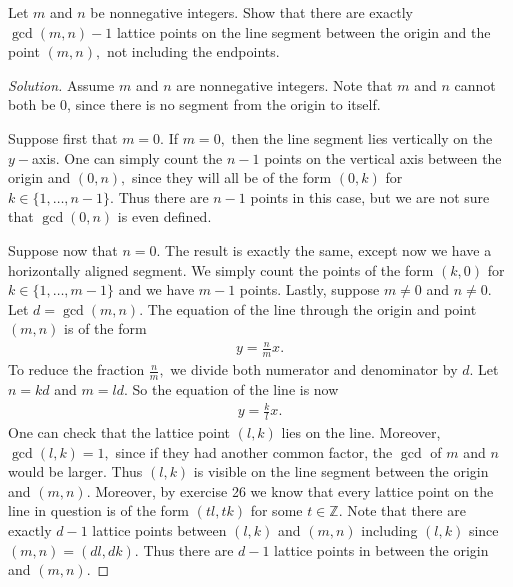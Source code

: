 \documentclass[12pt]{article}
\newcommand{\Z}{\mathbb{Z}}
\newenvironment{exercise}[2][Exercise]{\begin{trivlist}
        \item[\hskip \labelsep {\bfseries #1}\hskip \labelsep {\bfseries #2.}]}{\end{trivlist}}
\newenvironment{solution}
        {\begin{proof}[Solution]}
                    {\end{proof}}
\begin{document}
\begin{exercise}{27}
    Let \( m \) and \( n \) be nonnegative integers. Show that there are exactly \( \gcd(m,n ) -1 \) lattice points on the line segment between the origin and the point \( ( m,n ) , \) not including the endpoints.
    \begin{solution}
        Assume \( m \) and \( n \) are nonnegative integers. Note that \( m \) and \( n \) cannot both be 0, since there is no segment from the origin to itself.
        
        Suppose first that \( m = 0. \) If \( m=0, \) then the line segment lies vertically on the \( y- \)axis. One can simply count the \( n-1 \) points on the vertical axis between the origin and \( ( 0,n ) , \) since they will all be of the form \( ( 0,k ) \) for \( k \in \{ 1, \ldots, n-1 \} . \) Thus there are \( n-1 \) points in this case, but we are not sure that \( \gcd(0,n) \) is even defined.
        
        Suppose now that \( n = 0. \) The result is exactly the same, except now we have a horizontally aligned segment. We simply count the points of the form \( ( k, 0 ) \) for \( k \in \{ 1, \ldots, m-1 \} \) and we have \( m-1 \) points.
        Lastly, suppose \( m \neq 0 \) and \( n\neq 0. \) Let \( d = \gcd(m,n) . \) The equation of the line through the origin and point \( ( m,n ) \) is of the form
        \begin{align*}
            y = \frac{n}{m} x.
        \end{align*}
        To reduce the fraction \( \frac{n}{m} ,\) we divide both numerator and denominator by \( d \). Let \( n = k d \) and \( m = l d. \) So the equation of the line is now
        \begin{align*}
            y = \frac{k}{l} x.
        \end{align*}
        One can check that the lattice point \( ( l, k ) \) lies on the line. Moreover, \( \gcd(l,k) = 1, \) since if they had another common factor, the \( \gcd \) of \( m \) and \( n \) would be larger. Thus \( ( l, k ) \) is visible on the line segment between the origin and \( ( m,n ) . \) Moreover, by exercise 26 we know that every lattice point on the line in question is of the form \( ( tl,tk )  \) for some \( t \in \Z. \) Note that there are exactly \( d-1 \) lattice points between \( ( l,k ) \) and \( ( m,n ) \) including \( ( l,k ) \) since \( ( m,n ) = ( dl, dk ) . \) Thus there are \( d-1 \) lattice points in between the origin and \( ( m,n ) . \)
    \end{solution}
\end{exercise}
\end{document}
